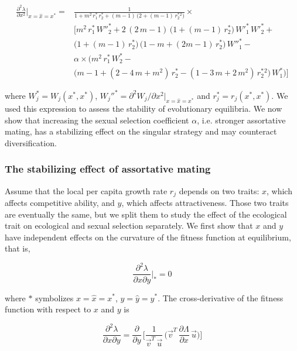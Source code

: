 \begin{equation}
    \begin{split}
        \frac{\partial^2 \lambda}{\partial x^2}\bigg|_{x=\hat x=x^*}=&\frac{1}{1 + m^2\,r^*_1\,r^*_2 + (m - 1)\,\big(2 + (m - 1)\,r^*_2^2\big)} \times \\
        &\Bigg[m^2\, r^*_ 1\, W''^*_2 + 2\, (2\, m - 1)\, \big(1 + (m - 1)\, r^*_ 2\big)\, W'^*_1 \, W'^*_2 +\\
        &\big(1 + (m - 1) \, r^*_ 2\big)\, \big(1 - m + (2 m - 1) \,r^*_ 2\big)\, W''^*_1 -\\
        &\alpha \times \Big(m^2\, r^*_ 1\, W^*_2 - \\
        & \big(m - 1 + (2 - 4\,m + m^2)\, r^*_ 2 - (1 - 3\,m + 2\,m^2)\,r^*_ 2^2\big)\,W^*_1 \Big)\Bigg]
    \end{split}
    \label{eq:fitness_curvature_equilibrium_expression}
\end{equation}

where $W_j^* = W_j(x^*, x^*)$, $W_j''^* = \partial^2 W_j / \partial x^2 |_{x=\hat{x}=x^*}$ and $r_j^* = r_j(x^*, x^*)$. We used this expression to assess the stability of evolutionary equilibria. We now show that increasing the sexual selection coefficient $\alpha$, i.e. stronger assortative mating, has a stabilizing effect on the singular strategy and may counteract diversification.

\subsubsection*{The stabilizing effect of assortative mating}

Assume that the local per capita growth rate $r_j$ depends on two traits: $x$, which affects competitive ability, and $y$, which affects attractiveness. Those two traits are eventually the same, but we split them to study the effect of the ecological trait on ecological and sexual selection separately. We first show that $x$ and $y$ have independent effects on the curvature of the fitness function at equilibrium, that is,

\begin{equation}
    \frac{\partial^2 \lambda}{\partial x \partial y}\bigg|_* = 0
\end{equation}

where $*$ symbolizes $x=\hat x=x^*$, $y=\hat y=y^*$. The cross-derivative of the fitness function with respect to $x$ and $y$ is

\begin{equation}
    \frac{\partial^2 \lambda}{\partial x \partial y} = \frac{\partial}{\partial y}\,\Bigg[\frac{1}{\overrightarrow{v}^T\,\overrightarrow{u}}\,\bigg( \overrightarrow{v}^T\,\frac{\partial \Lambda}{\partial x}\,\overrightarrow{u} \bigg)\Bigg]
\end{equation}

